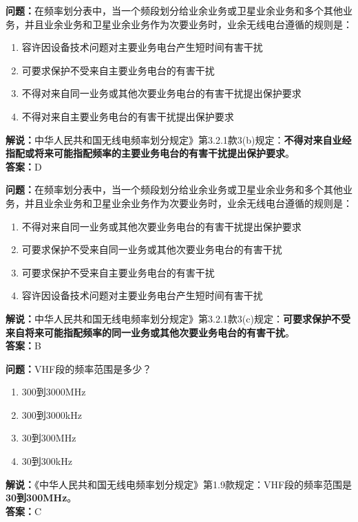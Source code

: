 \bigskip


\noindent\textbf{问题：}在频率划分表中，当一个频段划分给业余业务或卫星业余业务和多个其他业务，并且业余业务和卫星业余业务作为次要业务时，业余无线电台遵循的规则是：
\begin{enumerate}[label=\Alph*), leftmargin=3em]
	\item 容许因设备技术问题对主要业务电台产生短时间有害干扰
	\item 可要求保护不受来自主要业务电台的有害干扰
	\item 不得对来自同一业务或其他次要业务电台的有害干扰提出保护要求
	\item 不得对来自主要业务电台的有害干扰提出保护要求
\end{enumerate}
\noindent\textbf{解说：}中华人民共和国无线电频率划分规定》第3.2.1款3(b)规定：\textbf{不得对来自业经指配或将来可能指配频率的主要业务电台的有害干扰提出保护要求}。\\\textbf{答案：}D




\bigskip


\noindent\textbf{问题：}在频率划分表中，当一个频段划分给业余业务或卫星业余业务和多个其他业务，并且业余业务和卫星业余业务作为次要业务时，业余无线电台遵循的规则是：
\begin{enumerate}[label=\Alph*), leftmargin=3em]
	\item 不得对来自同一业务或其他次要业务电台的有害干扰提出保护要求
	\item 可要求保护不受来自同一业务或其他次要业务电台的有害干扰
	\item 可要求保护不受来自主要业务电台的有害干扰
	\item 容许因设备技术问题对主要业务电台产生短时间有害干扰
\end{enumerate}
\noindent\textbf{解说：}中华人民共和国无线电频率划分规定》第3.2.1款3(c)规定：\textbf{可要求保护不受来自将来可能指配频率的同一业务或其他次要业务电台的有害干扰}。\\
\textbf{答案：}B




\bigskip


\noindent\textbf{问题：}VHF段的频率范围是多少？
\begin{enumerate}[label=\Alph*), leftmargin=3em]
	\item 300到3000MHz
	\item 300到3000kHz
	\item 30到300MHz
	\item 30到300kHz
\end{enumerate}
\noindent\textbf{解说：}《中华人民共和国无线电频率划分规定》第1.9款规定：VHF段的频率范围是\textbf{30到300MHz}。\\\noindent\textbf{答案：}C

